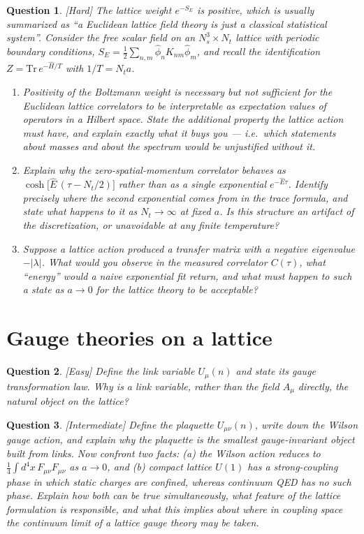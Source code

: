 \documentclass[11pt]{article}
\newcommand{\diff}[1]{\textcolor{blue!60!black}{\footnotesize\textsf{[#1]}}\quad}
\newtheorem{question}{Question}
\begin{document}
\begin{question}
\diff{Hard} The lattice weight $e^{-S_E}$ is positive, which is usually summarized as ``a Euclidean lattice field theory is just a classical statistical system''. Consider the free scalar field on an $N_s^3\times N_t$ lattice with periodic boundary conditions, $S_E = \tfrac{1}{2}\sum_{n,m}\hat\phi_n K_{nm}\hat\phi_m$, and recall the identification $Z = \mathrm{Tr}\, e^{-\hat H/T}$ with $1/T = N_t a$.
\begin{enumerate}[label=(\roman*), leftmargin=*]
  \item Positivity of the Boltzmann weight is \emph{necessary but not sufficient} for the Euclidean lattice correlators to be interpretable as expectation values of operators in a Hilbert space. State the additional property the lattice action must have, and explain exactly what it buys you --- i.e.\ which statements about masses and about the spectrum would be unjustified without it.
  \item Explain why the zero-spatial-momentum correlator behaves as $\cosh\!\big[\hat E\,(\tau - N_t/2)\big]$ rather than as a single exponential $e^{-\hat E \tau}$. Identify precisely where the second exponential comes from in the trace formula, and state what happens to it as $N_t\to\infty$ at fixed $a$. Is this structure an artifact of the discretization, or unavoidable at any finite temperature?
  \item Suppose a lattice action produced a transfer matrix with a \emph{negative} eigenvalue $-|\lambda|$. What would you observe in the measured correlator $C(\tau)$, what ``energy'' would a naive exponential fit return, and what must happen to such a state as $a\to 0$ for the lattice theory to be acceptable?
\end{enumerate}
\end{question}

\section{Gauge theories on a lattice}

\begin{question}
\diff{Easy} Define the link variable $U_\mu(n)$ and state its gauge transformation law. Why is a link variable, rather than the field $A_\mu$ directly, the natural object on the lattice?
\end{question}

\begin{question}
\diff{Intermediate} Define the plaquette $U_{\mu\nu}(n)$, write down the Wilson gauge action, and explain why the plaquette is the smallest gauge-invariant object built from links. Now confront two facts: (a) the Wilson action reduces to $\tfrac14\int d^4x\, F_{\mu\nu}F_{\mu\nu}$ as $a\to 0$, and (b) \emph{compact} lattice $U(1)$ has a strong-coupling phase in which static charges are confined, whereas continuum QED has no such phase. Explain how both can be true simultaneously, what feature of the lattice formulation is responsible, and what this implies about \emph{where} in coupling space the continuum limit of a lattice gauge theory may be taken.
\end{question}
\end{document}
